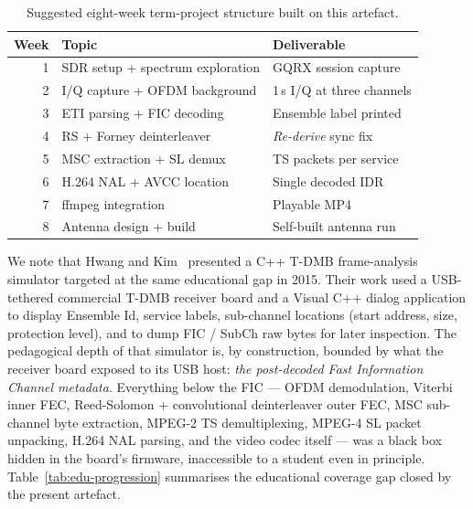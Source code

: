 \documentclass[11pt,a4paper]{article}
\begin{document}
\begin{table}[t]
\centering
\caption{Suggested eight-week term-project structure built on this
artefact.}
\label{tab:syllabus}
\begin{tabular}{rlp{4.3cm}}
\toprule
Week & Topic & Deliverable \\
\midrule
1 & SDR setup + spectrum exploration  & GQRX session capture \\
2 & I/Q capture + OFDM background     & 1\,s I/Q at three channels \\
3 & ETI parsing + FIC decoding        & Ensemble label printed \\
4 & RS + Forney deinterleaver         & \emph{Re-derive} sync fix \\
5 & MSC extraction + SL demux         & TS packets per service \\
6 & H.264 NAL + AVCC location         & Single decoded IDR \\
7 & ffmpeg integration                & Playable MP4 \\
8 & Antenna design + build            & Self-built antenna run \\
\bottomrule
\end{tabular}
\end{table}

We note that Hwang and Kim~\cite{hwang2015simulator} presented a
C++ T-DMB frame-analysis simulator targeted at the same
educational gap in 2015.  Their work used a USB-tethered
commercial T-DMB receiver board and a Visual C++ dialog application
to display Ensemble Id, service labels, sub-channel locations
(start address, size, protection level), and to dump FIC / SubCh
raw bytes for later inspection.  The pedagogical depth of that
simulator is, by construction, bounded by what the receiver board
exposed to its USB host: \emph{the post-decoded Fast Information
Channel metadata}.  Everything below the FIC --- OFDM
demodulation, Viterbi inner FEC, Reed-Solomon + convolutional
deinterleaver outer FEC, MSC sub-channel byte extraction,
MPEG-2 TS demultiplexing, MPEG-4 SL packet unpacking, H.264 NAL
parsing, and the video codec itself --- was a black box hidden in
the board's firmware, inaccessible to a student even in principle.
Table~\ref{tab:edu-progression} summarises the educational
coverage gap closed by the present artefact.
\end{document}
